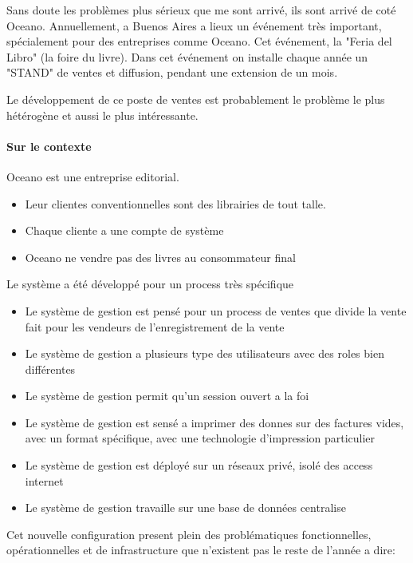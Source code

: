 \documentclass{resume} %
\begin{document}
		Sans doute les problèmes plus sérieux que me sont arrivé, ils sont arrivé de coté Oceano. 
		Annuellement, a Buenos Aires a lieux un événement très important, spécialement pour des entreprises comme Oceano. Cet événement, la "Feria del Libro" (la foire du livre). 
		Dans cet événement on installe chaque année un "STAND" de ventes et diffusion, pendant une extension de un mois. 

		Le développement de ce poste de ventes est probablement le problème le plus hétérogène et aussi le plus intéressante. 

		\paragraph{ Sur le contexte } 

		Oceano est une entreprise editorial. 

		\begin {itemize} 
		 \item Leur clientes conventionnelles sont des librairies de tout talle.
		 \item Chaque cliente a une compte de système
		 \item Oceano ne vendre pas des livres au consommateur final
		 \end{itemize} 

		Le système a été développé pour un process très spécifique 
		 \begin{itemize}  
		   \item Le système de gestion est pensé pour un process de ventes que divide la vente fait pour les vendeurs de l'enregistrement de la vente
		   \item Le système de gestion a plusieurs type des utilisateurs avec des roles bien différentes
		   \item Le système de gestion permit qu'un session ouvert a la foi 
		   \item Le système de gestion est sensé a imprimer des donnes sur des factures vides, avec un format spécifique, avec une technologie d'impression particulier
		   \item Le système de gestion est déployé sur un réseaux privé, isolé des access internet
		   \item Le système de gestion travaille sur une base de données centralise
		 \end{itemize}  

		Cet nouvelle configuration present plein des problématiques fonctionnelles, opérationnelles et de infrastructure  que n'existent pas le reste de l'année a dire: 
\end{document}
